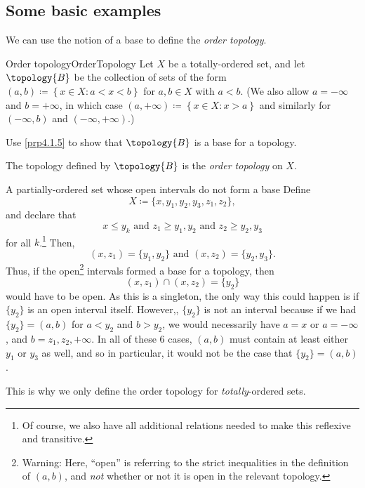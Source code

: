 \subsection{Some basic examples}

We can use the notion of a base to define the \emph{order topology}.
\begin{dfn}{Order topology}{OrderTopology}
Let $X$ be a totally-ordered set, and let $\topology{B}$ be the collection of sets of the form $(a,b)\coloneqq \left\{ x\in X:a<x<b\right\}$ for $a,b\in X$ with $a<b$.  (We also allow $a=-\infty$ and $b=+\infty$, in which case $(a,+\infty )\coloneqq \left\{ x\in X:x>a\right\}$ and similarly for $(-\infty ,b)$ and $(-\infty, +\infty)$.)
\begin{exr}[breakable=false]{}{}
Use \cref{prp4.1.5} to show that $\topology{B}$ is a base for a topology.
\end{exr}
The topology defined by $\topology{B}$ is the \emph{order topology} on $X$.
\end{dfn}
\begin{exm}{A partially-ordered set whose open intervals do not form a base}{}
Define
\begin{equation}
X\coloneqq \{ x,y_1,y_2,y_3,z_1,z_2\} ,
\end{equation}
and declare that
\begin{equation}
x\leq y_k\text{ and }z_1\geq y_1,y_2\text{ and }z_2\geq y_2,y_3
\end{equation}
for all $k$.\footnote{Of course, we also have all additional relations needed to make this reflexive and transitive.}  Then,
\begin{equation}
(x,z_1)=\{ y_1,y_2\} \text{ and }(x,z_2)=\{ y_2,y_3\} .
\end{equation}
Thus, if the open\footnote{Warning:  Here, ``open'' is referring to the strict inequalities in the definition of $(a,b)$, and \emph{not} whether or not it is open in the relevant topology.} intervals formed a base for a topology, then
\begin{equation}
(x,z_1)\cap (x,z_2)=\{ y_2\} 
\end{equation}
would have to be open.  As this is a singleton, the only way this could happen is if $\{ y_2\}$ is an open interval itself.  However,, $\{ y_2\}$ is not an interval because if we had $\{ y_2\} =(a,b)$ for $a<y_2$ and $b>y_2$, we would necessarily have $a=x$ or $a=-\infty$, and $b=z_1,z_2,+\infty$.  In all of these $6$ cases, $(a,b)$ must contain at least either $y_1$ or $y_3$ as well, and so in particular, it would not be the case that $\{ y_2\} =(a,b)$.
\begin{rmk}
This is why we only define the order topology for \emph{totally}-ordered sets.
\end{rmk}
\end{exm}
